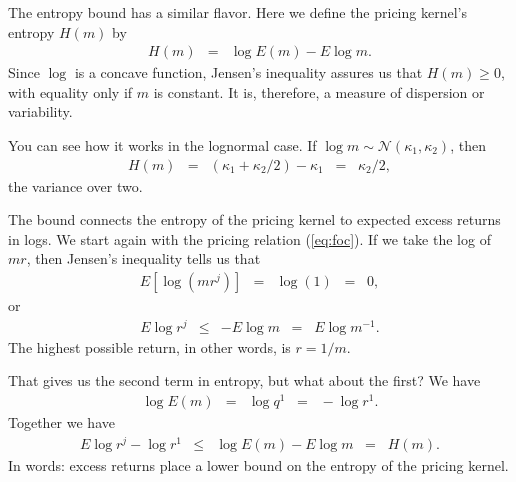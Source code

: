 \documentclass[11pt]{article}
\begin{document}
The entropy bound has a similar flavor.
Here we define the pricing kernel's entropy $H(m)$ by
\begin{eqnarray*}
    H(m) &=& \log E(m) - E \log m .
\end{eqnarray*}
Since $\log$ is a concave function,
Jensen's inequality assures us that $H(m) \geq 0$,
with equality only if $m$ is constant.
It is, therefore, a measure of dispersion or variability.

You can see how it works in the lognormal case.
If $ \log m \sim \mathcal{N}(\kappa_1,\kappa_2)$,
then
\begin{eqnarray*}
    H(m) &=& (\kappa_1 + \kappa_2/2) - \kappa_1
            \;\;=\;\; \kappa_2/2 ,
\end{eqnarray*}
the variance over two.

The bound connects the entropy of the pricing kernel to expected excess returns in logs.
We start again with the pricing relation (\ref{eq:foc}).
If we take the log of $mr$, then Jensen's inequality tells us that
\begin{eqnarray*}
    E \left[ \log ( m r^j )\right] &=& \log (1) \;\;=\;\; 0 ,
\end{eqnarray*}
or
\begin{eqnarray*}
    E  \log r^j  &\leq& - E \log m \;\;=\;\; E \log m^{-1} .
\end{eqnarray*}
The highest possible return, in other words, is $r = 1/m$.

That gives us the second term in entropy, but what about the first?
We have
\begin{eqnarray*}
     \log E (m)  &=& \log q^1 \;\;=\;\; - \log r^1 .
\end{eqnarray*}
Together we have
\begin{eqnarray*}
    E  \log r^j - \log r^1  &\leq& \log E(m) - E \log m  \;\;=\;\; H(m) .
\end{eqnarray*}
In words: excess returns place a lower bound on the entropy
of the pricing kernel.
\end{document}
